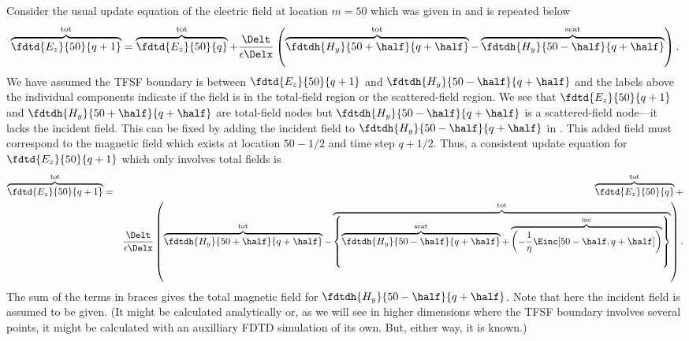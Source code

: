 Consider the usual update equation of the electric field at location
$m=50$ which was given in  and is repeated below
\begin{equation}
  \overbrace{\fdtd{E_z}{50}{q+1}}^{\mbox{\scriptsize tot}}
  =
  \overbrace{\fdtd{E_z}{50}{q}}^{\mbox{\scriptsize tot}} + 
  \frac{\Delt}{\epsilon\Delx}
   \left(
  \overbrace{\fdtdh{H_y}{50+\half}{q+\half}}^{\mbox{\scriptsize tot}} -
  \overbrace{\fdtdh{H_y}{50-\half}{q+\half}}^{\mbox{\scriptsize scat}}
  \right).
  \label{eq:updateEzTFSF}
\end{equation}
We have assumed the TFSF boundary is between $\fdtd{E_z}{50}{q+1}$
and $\fdtdh{H_y}{50-\half}{q+\half}$ and the labels above the individual
components indicate if the field is in the total-field region or the
scattered-field region.  We see that $\fdtd{E_z}{50}{q+1}$ and
$\fdtdh{H_y}{50+\half}{q+\half}$ are total-field nodes but
$\fdtdh{H_y}{50-\half}{q+\half}$ is a scattered-field node---it lacks
the incident field.  This can be fixed by adding the incident field to
$\fdtdh{H_y}{50-\half}{q+\half}$ in
.  This added field must correspond to the
magnetic field which exists at location $50-1/2$ and time step
$q+1/2$.  Thus, a consistent update equation for $\fdtd{E_z}{50}{q+1}$
which only involves total fields is
\begin{eqnarray}
  \overbrace{\fdtd{E_z}{50}{q+1}}^{\mbox{\scriptsize tot}} &=&
  \overbrace{\fdtd{E_z}{50}{q}}^{\mbox{\scriptsize tot}} + {} \\
  &&\frac{\Delt}{\epsilon\Delx}
   \left(
   \overbrace{\fdtdh{H_y}{50+\half}{q+\half}}^{\mbox{\scriptsize tot}} -
   \overbrace{
   \left\{
   \overbrace{\fdtdh{H_y}{50-\half}{q+\half}}^{\mbox{\scriptsize scat}} +
   \overbrace{\left(
     -\frac{1}{\eta}\Einc\!\left[50-\half,q+\half\right]
   \right)}^{\mbox{\scriptsize inc}}
   \right\}}^{\mbox{\scriptsize tot}}\right).
   \nonumber
   \label{eq:updateEzTFSFI}
\end{eqnarray}
The sum of the terms in braces gives the total magnetic field for
$\fdtdh{H_y}{50-\half}{q+\half}$.  Note that here the incident field
is assumed to be given.  (It might be calculated analytically or, as
we will see in higher dimensions where the TFSF boundary involves
several points, it might be calculated with an auxilliary FDTD
simulation of its own.  But, either way, it is known.)

